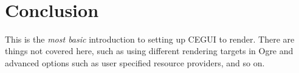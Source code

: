 ~\newline
 \hypertarget{rendering_tutorial_rendering_tutorial_conclusion}{}\section{Conclusion}\label{rendering_tutorial_rendering_tutorial_conclusion}
This is the {\itshape most basic} introduction to setting up C\+E\+G\+UI to render. There are things not covered here, such as using different rendering targets in Ogre and advanced options such as user specified resource providers, and so on. 